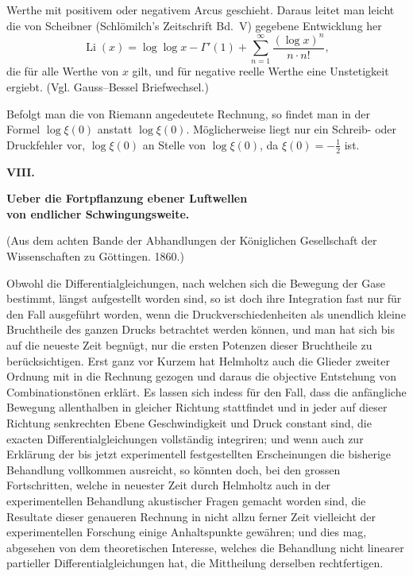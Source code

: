\documentclass[12pt,a4paper]{article}
\DeclareMathOperator{\Li}{Li}
\begin{document}
Werthe mit positivem oder negativem Arcus geschieht. Daraus leitet man leicht die von Scheibner (Schl\"omilch's Zeitschrift Bd.~V) gegebene Entwicklung her
\[
\Li(x) = \log\log x - \Gamma'(1) + \sum_{n=1}^{\infty}\frac{(\log x)^{n}}{n\cdot n!},
\]
die f\"ur alle Werthe von $x$ gilt, und f\"ur negative reelle Werthe eine Unstetigkeit ergiebt. (Vgl. Gauss--Bessel Briefwechsel.)

Befolgt man die von Riemann angedeutete Rechnung, so findet man in der Formel $\log\xi(0)$ anstatt $\log\xi(0)$. M\"oglicherweise liegt nur ein Schreib- oder Druckfehler vor, $\log\xi(0)$ an Stelle von $\log\xi(0)$, da $\xi(0) = -\frac{1}{2}$ ist.



\newpage
\begin{center}
\Large\textbf{VIII.}
\end{center}
\vspace{-0.5em}
\begin{center}
\Large\textbf{Ueber die Fortpflanzung ebener Luftwellen}\\[0.3em]
\Large\textbf{von endlicher Schwingungsweite.}
\end{center}
\vspace{0.3em}
\begin{center}
\small (Aus dem achten Bande der Abhandlungen der K\"oniglichen Gesellschaft der\\
\small Wissenschaften zu G\"ottingen. 1860.)
\end{center}

\bigskip

Obwohl die Differentialgleichungen, nach welchen sich die Bewegung der Gase bestimmt, l\"angst aufgestellt worden sind, so ist doch ihre Integration fast nur f\"ur den Fall ausgef\"uhrt worden, wenn die Druckverschiedenheiten als unendlich kleine Bruchtheile des ganzen Drucks betrachtet werden k\"onnen, und man hat sich bis auf die neueste Zeit begn\"ugt, nur die ersten Potenzen dieser Bruchtheile zu ber\"ucksichtigen. Erst ganz vor Kurzem hat Helmholtz auch die Glieder zweiter Ordnung mit in die Rechnung gezogen und daraus die objective Entstehung von Combinationst\"onen erkl\"art. Es lassen sich indess f\"ur den Fall, dass die anf\"angliche Bewegung allenthalben in gleicher Richtung stattfindet und in jeder auf dieser Richtung senkrechten Ebene Geschwindigkeit und Druck constant sind, die exacten Differentialgleichungen vollst\"andig integriren; und wenn auch zur Erkl\"arung der bis jetzt experimentell festgestellten Erscheinungen die bisherige Behandlung vollkommen ausreicht, so k\"onnten doch, bei den grossen Fortschritten, welche in neuester Zeit durch Helmholtz auch in der experimentellen Behandlung akustischer Fragen gemacht worden sind, die Resultate dieser genaueren Rechnung in nicht allzu ferner Zeit vielleicht der experimentellen Forschung einige Anhaltspunkte gew\"ahren; und dies mag, abgesehen von dem theoretischen Interesse, welches die Behandlung nicht linearer partieller Differentialgleichungen hat, die Mittheilung derselben rechtfertigen.
\end{document}
